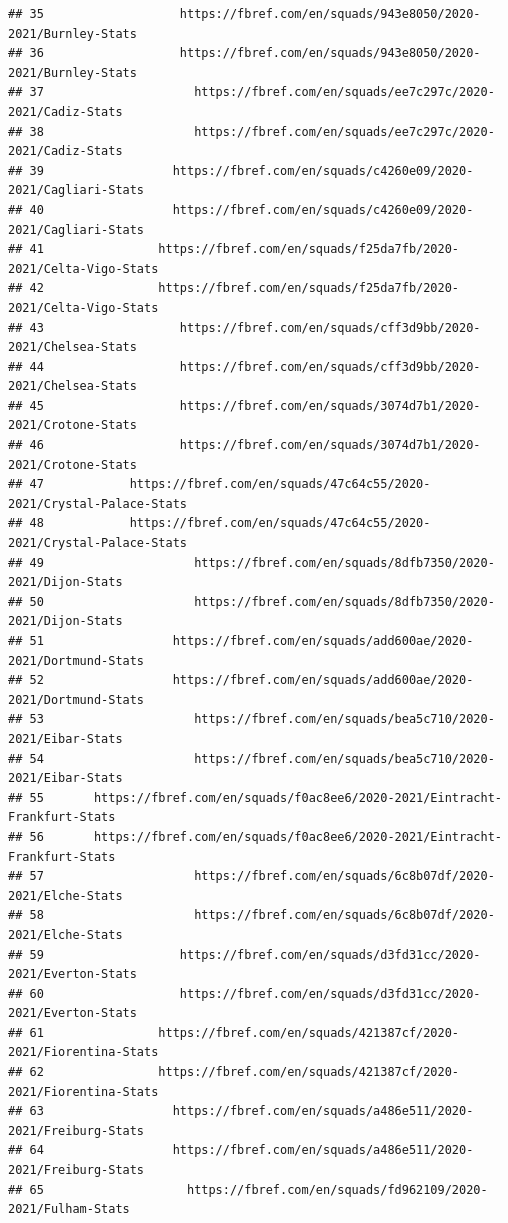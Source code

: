 \documentclass[
]{book}
\theoremstyle{definition}
\theoremstyle{definition}
\theoremstyle{definition}
\theoremstyle{definition}
\theoremstyle{remark}
\begin{document}
\begin{verbatim}
## 35                   https://fbref.com/en/squads/943e8050/2020-2021/Burnley-Stats
## 36                   https://fbref.com/en/squads/943e8050/2020-2021/Burnley-Stats
## 37                     https://fbref.com/en/squads/ee7c297c/2020-2021/Cadiz-Stats
## 38                     https://fbref.com/en/squads/ee7c297c/2020-2021/Cadiz-Stats
## 39                  https://fbref.com/en/squads/c4260e09/2020-2021/Cagliari-Stats
## 40                  https://fbref.com/en/squads/c4260e09/2020-2021/Cagliari-Stats
## 41                https://fbref.com/en/squads/f25da7fb/2020-2021/Celta-Vigo-Stats
## 42                https://fbref.com/en/squads/f25da7fb/2020-2021/Celta-Vigo-Stats
## 43                   https://fbref.com/en/squads/cff3d9bb/2020-2021/Chelsea-Stats
## 44                   https://fbref.com/en/squads/cff3d9bb/2020-2021/Chelsea-Stats
## 45                   https://fbref.com/en/squads/3074d7b1/2020-2021/Crotone-Stats
## 46                   https://fbref.com/en/squads/3074d7b1/2020-2021/Crotone-Stats
## 47            https://fbref.com/en/squads/47c64c55/2020-2021/Crystal-Palace-Stats
## 48            https://fbref.com/en/squads/47c64c55/2020-2021/Crystal-Palace-Stats
## 49                     https://fbref.com/en/squads/8dfb7350/2020-2021/Dijon-Stats
## 50                     https://fbref.com/en/squads/8dfb7350/2020-2021/Dijon-Stats
## 51                  https://fbref.com/en/squads/add600ae/2020-2021/Dortmund-Stats
## 52                  https://fbref.com/en/squads/add600ae/2020-2021/Dortmund-Stats
## 53                     https://fbref.com/en/squads/bea5c710/2020-2021/Eibar-Stats
## 54                     https://fbref.com/en/squads/bea5c710/2020-2021/Eibar-Stats
## 55       https://fbref.com/en/squads/f0ac8ee6/2020-2021/Eintracht-Frankfurt-Stats
## 56       https://fbref.com/en/squads/f0ac8ee6/2020-2021/Eintracht-Frankfurt-Stats
## 57                     https://fbref.com/en/squads/6c8b07df/2020-2021/Elche-Stats
## 58                     https://fbref.com/en/squads/6c8b07df/2020-2021/Elche-Stats
## 59                   https://fbref.com/en/squads/d3fd31cc/2020-2021/Everton-Stats
## 60                   https://fbref.com/en/squads/d3fd31cc/2020-2021/Everton-Stats
## 61                https://fbref.com/en/squads/421387cf/2020-2021/Fiorentina-Stats
## 62                https://fbref.com/en/squads/421387cf/2020-2021/Fiorentina-Stats
## 63                  https://fbref.com/en/squads/a486e511/2020-2021/Freiburg-Stats
## 64                  https://fbref.com/en/squads/a486e511/2020-2021/Freiburg-Stats
## 65                    https://fbref.com/en/squads/fd962109/2020-2021/Fulham-Stats

\end{verbatim}
\end{document}
